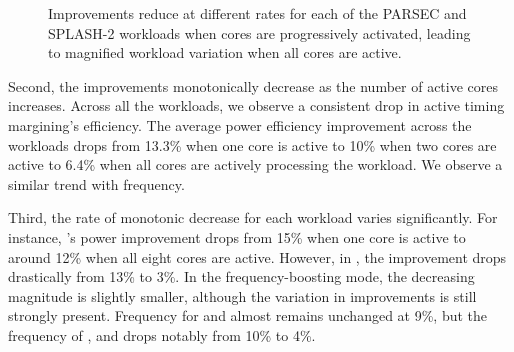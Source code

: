 \begin{figure}[t]
\vspace*{-.15in}
\centering
  \caption{Improvements reduce at different rates for each of the PARSEC and SPLASH-2 workloads when cores are progressively activated, leading to magnified workload variation when all cores are active.}
\label{fig:workloadvariation} 
\vspace{-0.2cm}
\end{figure}

Second, the improvements monotonically decrease as the number of active cores increases. Across all the workloads, we observe a consistent drop in active timing margining's efficiency. The average power efficiency improvement across the workloads drops from 13.3\% when one core is active to 10\% when two cores are active to 6.4\% when all cores are actively processing the workload. We observe a similar trend with frequency.

Third, the rate of monotonic decrease for each workload varies significantly. For instance, 's power improvement drops from 15\% when one core is active to around 12\% when all eight cores are active. However, in , the improvement drops drastically from 13\% to 3\%. In the frequency-boosting mode, the decreasing magnitude is slightly smaller, although the variation in improvements is still strongly present. Frequency for  and  almost remains unchanged at 9\%, but the frequency of ,  and  drops notably from 10\% to 4\%.

